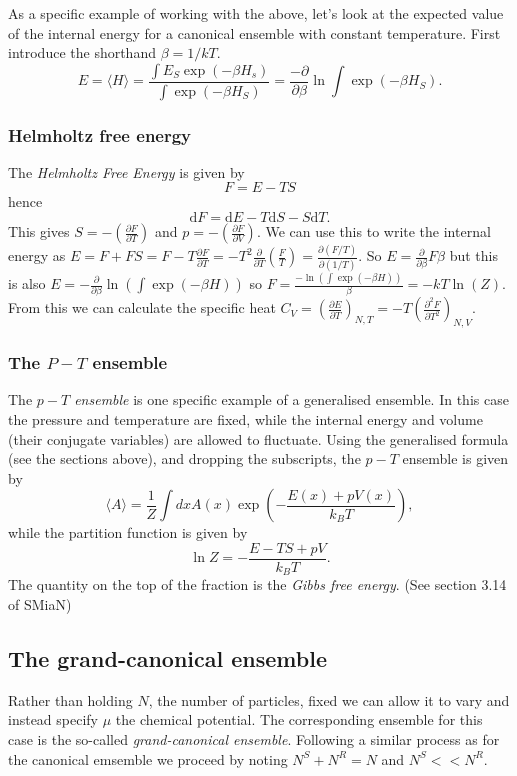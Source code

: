 As a specific example of working with the above, let's look at the expected value of the internal energy for a canonical ensemble with constant temperature. First introduce the shorthand $\beta = 1/kT$.
$$
	E = \langle H \rangle = \frac{\int E_S\exp(-\beta H_s)}{\int{\exp(-\beta H_S)}} = \frac{-\partial}{\partial \beta}\ln\int\exp(-\beta H_S).
$$

\subsubsection{Helmholtz free energy}
The \emph{Helmholtz Free Energy} is given by
$$
	F = E - TS
$$
hence
$$
	\mathrm{d}F = \mathrm{d}E - T\mathrm{d}S - S\mathrm{d}T.
$$
This gives $S= -\left(\frac{\partial F}{\partial T}\right)$ and $p = -\left(\frac{\partial F}{\partial V}\right)$. We can use this to write the  internal energy as $E=F+FS=F-T\frac{\partial F}{\partial T}=-T^2\frac{\partial}{\partial T}\left(\frac{F}{T}\right) = \frac{\partial (F/T)}{\partial (1/T)}$. So $E = \frac{\partial}{\partial \beta} F\beta$ but this is also $E = -\frac{\partial}{\partial\beta}\ln(\int\exp(-\beta H))$ so $F= \frac{-\ln(\int\exp(-\beta H))}{\beta} = -kT\ln(Z)$. From this we can calculate the specific heat $C_V = \left(\frac{\partial E}{\partial T} \right)_{N,T} = -T\left(\frac{\partial^2 F}{\partial T^2}\right)_{N,V}$.


\subsubsection{The $P-T$ ensemble}
The \emph{$p-T$ ensemble} is one specific example of a generalised ensemble. In this case the pressure and temperature are fixed, while the internal energy and volume (their conjugate variables) are allowed to fluctuate.
Using the generalised formula (see the sections above), and dropping the subscripts, the $p-T$ ensemble is given by
 \begin{equation*}
	\langle A\rangle = \frac{1}{Z}\int dxA(x)\exp\left(-\frac{E(x)+pV(x)}{k_BT}\right),
\end{equation*}
while the partition function is given by
$$
	\ln Z = -\frac{E-TS+pV}{k_BT}.
$$
The quantity on the top of the fraction is the \emph{Gibbs free energy}. (See section 3.14 of SMiaN)


\subsection{The grand-canonical ensemble}
Rather than holding $N$, the number of particles, fixed we can allow it to vary and instead specify $\mu$ the chemical potential. The corresponding ensemble for this case is the so-called \emph{grand-canonical ensemble}. Following a similar process as for the canonical emsemble we proceed by noting $N^S+N^R = N$ and $N^S<<N^R$. 

